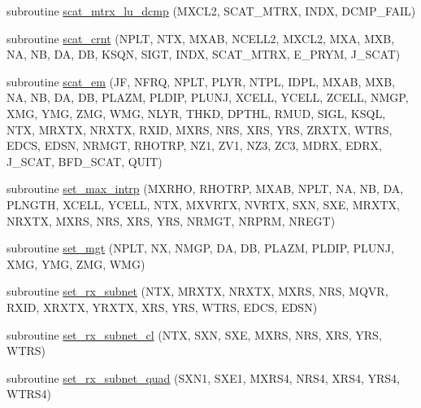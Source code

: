 \begin{DoxyCompactItemize}
subroutine \hyperlink{Leroi_8f90_aeb059f2d64018397965c145c4af183ff}{scat\+\_\+mtrx\+\_\+lu\+\_\+dcmp} (M\+X\+C\+L2, S\+C\+A\+T\+\_\+\+M\+T\+RX, I\+N\+DX, D\+C\+M\+P\+\_\+\+F\+A\+IL)
\item 
subroutine \hyperlink{Leroi_8f90_aef77ff6f17e654fc7f89a638ad1d2d46}{scat\+\_\+crnt} (N\+P\+LT, N\+TX, M\+X\+AB, N\+C\+E\+L\+L2, M\+X\+C\+L2, M\+XA, M\+XB, NA, NB, DA, DB, K\+S\+QN, S\+I\+GT, I\+N\+DX, S\+C\+A\+T\+\_\+\+M\+T\+RX, E\+\_\+\+P\+R\+YM, J\+\_\+\+S\+C\+AT)
\item 
subroutine \hyperlink{Leroi_8f90_a75fe85be755349539d5b76874d678237}{scat\+\_\+em} (JF, N\+F\+RQ, N\+P\+LT, P\+L\+YR, N\+T\+PL, I\+D\+PL, M\+X\+AB, M\+XB, NA, NB, DA, DB, P\+L\+A\+ZM, P\+L\+D\+IP, P\+L\+U\+NJ, X\+C\+E\+LL, Y\+C\+E\+LL, Z\+C\+E\+LL, N\+M\+GP, X\+MG, Y\+MG, Z\+MG, W\+MG, N\+L\+YR, T\+H\+KD, D\+P\+T\+HL, R\+M\+UD, S\+I\+GL, K\+S\+QL, N\+TX, M\+R\+X\+TX, N\+R\+X\+TX, R\+X\+ID, M\+X\+RS, N\+RS, X\+RS, Y\+RS, Z\+R\+X\+TX, W\+T\+RS, E\+D\+CS, E\+D\+SN, N\+R\+M\+GT, R\+H\+O\+T\+RP, N\+Z1, Z\+V1, N\+Z3, Z\+C3, M\+D\+RX, E\+D\+RX, J\+\_\+\+S\+C\+AT, B\+F\+D\+\_\+\+S\+C\+AT, Q\+U\+IT)
\item 
subroutine \hyperlink{Leroi_8f90_a27d896475f3529fb2188ec4474b27717}{set\+\_\+max\+\_\+intrp} (M\+X\+R\+HO, R\+H\+O\+T\+RP, M\+X\+AB, N\+P\+LT, NA, NB, DA, P\+L\+N\+G\+TH, X\+C\+E\+LL, Y\+C\+E\+LL, N\+TX, M\+X\+V\+R\+TX, N\+V\+R\+TX, S\+XN, S\+XE, M\+R\+X\+TX, N\+R\+X\+TX, M\+X\+RS, N\+RS, X\+RS, Y\+RS, N\+R\+M\+GT, N\+R\+P\+RM, N\+R\+E\+GT)
\item 
subroutine \hyperlink{Leroi_8f90_a820f6bd31435032872330d97a6fdf404}{set\+\_\+mgt} (N\+P\+LT, NX, N\+M\+GP, DA, DB, P\+L\+A\+ZM, P\+L\+D\+IP, P\+L\+U\+NJ, X\+MG, Y\+MG, Z\+MG, W\+MG)
\item 
subroutine \hyperlink{Leroi_8f90_a9100f1607055290b050e961c8027016a}{set\+\_\+rx\+\_\+subnet} (N\+TX, M\+R\+X\+TX, N\+R\+X\+TX, M\+X\+RS, N\+RS, M\+Q\+VR, R\+X\+ID, X\+R\+X\+TX, Y\+R\+X\+TX, X\+RS, Y\+RS, W\+T\+RS, E\+D\+CS, E\+D\+SN)
\item 
subroutine \hyperlink{Leroi_8f90_a805e33739aa8ba4bfe42148473309ce0}{set\+\_\+rx\+\_\+subnet\+\_\+cl} (N\+TX, S\+XN, S\+XE, M\+X\+RS, N\+RS, X\+RS, Y\+RS, W\+T\+RS)
\item 
subroutine \hyperlink{Leroi_8f90_a397597f84bff232d8a1a2f4a44e6e75f}{set\+\_\+rx\+\_\+subnet\+\_\+quad} (S\+X\+N1, S\+X\+E1, M\+X\+R\+S4, N\+R\+S4, X\+R\+S4, Y\+R\+S4, W\+T\+R\+S4)
\item 

\end{DoxyCompactItemize}
